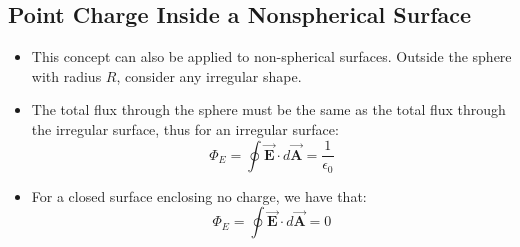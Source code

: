 \documentclass[11pt, a4paper]{article}
\begin{document}
\subsection{Point Charge Inside a Nonspherical Surface}
\begin{itemize}
    \item This concept can also be applied to non-spherical surfaces. Outside the sphere
        with radius $R$, consider any irregular shape.
    \item The total flux through the sphere must be the same as the total flux through
        the irregular surface, thus for an irregular surface:
        \begin{equation}
            \Phi_E = \oint \vec{\mathbf{E}} \cdot d \vec{\mathbf{A}} =
            \frac{1}{\epsilon_0}
        \end{equation}
    \item For a closed surface enclosing no charge, we have that:
        \begin{equation}
            \Phi_E = \oint \vec{\mathbf{E}} \cdot d \vec{\mathbf{A}} = 0
        \end{equation}
\end{itemize}
\end{document}

